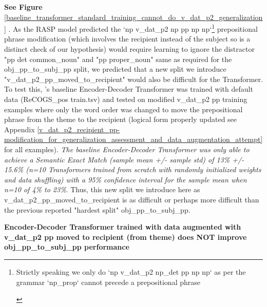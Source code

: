 \documentclass[11pt]{article}
\begin{document}
\textbf{See Figure} \ref{baseline_transformer_standard_training_cannot_do_v_dat_p2_generalization} . As the RASP model predicted the `np v\_dat\_p2 np pp np np`\footnote{\begin{footnotesize}Strictly speaking we only do `np v\_dat\_p2 np\_det pp np np` as per the grammar `np\_prop` cannot precede a prepositional phrase
\end{footnotesize}
} prepositional phrase modification (which involves the recipient instead of the subject so is a distinct check of our hypothesis) would require learning to ignore the distractor "pp det common\_noun" and "pp proper\_noun" same as required for the obj\_pp\_to\_subj\_pp split, we predicted that a new split we introduce "v\_dat\_p2\_pp\_moved\_to\_recipient" would also be difficult for the Transformer. To test this, \citep{Wu2023}'s baseline Encoder-Decoder Transformer was trained with default data (ReCOGS\_pos train.tsv) and tested on modified v\_dat\_p2 pp training examples where only the word order was changed to move the prepositional phrase from the theme to the recipient (logical form properly updated see Appendix \ref{v_dat_p2_recipient_pp-modification_for_generalization_assessment_and_data_augmentation_attempt} for all examples). \textit{The baseline \citep{Wu2023} Encoder-Decoder Transformer was only able to achieve a Semantic Exact Match (sample mean +/- sample std) of 13\% +/- 15.6\% (n=10 Transformers trained from scratch with randomly initialized weights and data shuffling) with a 95\% confidence interval for the sample mean when n=10 of 4\% to 23\%}. Thus, this new split we introduce here as v\_dat\_p2\_pp\_moved\_to\_recipient is as difficult or perhaps more difficult than the previous reported "hardest split" obj\_pp\_to\_subj\_pp.


\textbf{\citep{Wu2023} Encoder-Decoder Transformer trained with data augmented with v\_dat\_p2 pp moved to recipient (from theme) does NOT improve obj\_pp\_to\_subj\_pp performance}
\end{document}
